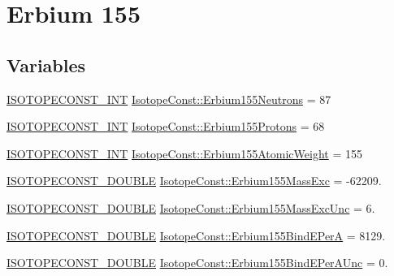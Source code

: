 \hypertarget{group___isotope_const-_erbium-_er155}{}\section{Erbium 155}
\label{group___isotope_const-_erbium-_er155}
\subsection*{Variables}
\begin{DoxyCompactItemize}
\item 
\mbox{\hyperlink{group___isotope_const-_macros_ga5f18360b3e99483a35c32d789e62621c}{I\+S\+O\+T\+O\+P\+E\+C\+O\+N\+S\+T\+\_\+\+I\+NT}} \mbox{\hyperlink{group___isotope_const-_erbium-_er155_ga62b8da5c9e3ec9d173ea30e18b9574f8}{Isotope\+Const\+::\+Erbium155\+Neutrons}} = 87
\item 
\mbox{\hyperlink{group___isotope_const-_macros_ga5f18360b3e99483a35c32d789e62621c}{I\+S\+O\+T\+O\+P\+E\+C\+O\+N\+S\+T\+\_\+\+I\+NT}} \mbox{\hyperlink{group___isotope_const-_erbium-_er155_ga6cd0a94297ede6e6f3cac04d37b50ee6}{Isotope\+Const\+::\+Erbium155\+Protons}} = 68
\item 
\mbox{\hyperlink{group___isotope_const-_macros_ga5f18360b3e99483a35c32d789e62621c}{I\+S\+O\+T\+O\+P\+E\+C\+O\+N\+S\+T\+\_\+\+I\+NT}} \mbox{\hyperlink{group___isotope_const-_erbium-_er155_ga1bd08507670691a8c7cde7726391ad7e}{Isotope\+Const\+::\+Erbium155\+Atomic\+Weight}} = 155
\item 
\mbox{\hyperlink{group___isotope_const-_macros_ga8f45a7272ce02c0b4c65c44636ed719a}{I\+S\+O\+T\+O\+P\+E\+C\+O\+N\+S\+T\+\_\+\+D\+O\+U\+B\+LE}} \mbox{\hyperlink{group___isotope_const-_erbium-_er155_ga826271f91eead86830cbafcabed50c73}{Isotope\+Const\+::\+Erbium155\+Mass\+Exc}} = -\/62209.
\item 
\mbox{\hyperlink{group___isotope_const-_macros_ga8f45a7272ce02c0b4c65c44636ed719a}{I\+S\+O\+T\+O\+P\+E\+C\+O\+N\+S\+T\+\_\+\+D\+O\+U\+B\+LE}} \mbox{\hyperlink{group___isotope_const-_erbium-_er155_gae74e69fe135014579fc79de735c4120d}{Isotope\+Const\+::\+Erbium155\+Mass\+Exc\+Unc}} = 6.
\item 
\mbox{\hyperlink{group___isotope_const-_macros_ga8f45a7272ce02c0b4c65c44636ed719a}{I\+S\+O\+T\+O\+P\+E\+C\+O\+N\+S\+T\+\_\+\+D\+O\+U\+B\+LE}} \mbox{\hyperlink{group___isotope_const-_erbium-_er155_gad62c4c08612c8c2c17e265d97303d7b0}{Isotope\+Const\+::\+Erbium155\+Bind\+E\+PerA}} = 8129.
\item 
\mbox{\hyperlink{group___isotope_const-_macros_ga8f45a7272ce02c0b4c65c44636ed719a}{I\+S\+O\+T\+O\+P\+E\+C\+O\+N\+S\+T\+\_\+\+D\+O\+U\+B\+LE}} \mbox{\hyperlink{group___isotope_const-_erbium-_er155_ga5158e73fa3022e17e4feb77b36f7816d}{Isotope\+Const\+::\+Erbium155\+Bind\+E\+Per\+A\+Unc}} = 0.

\end{DoxyCompactItemize}
